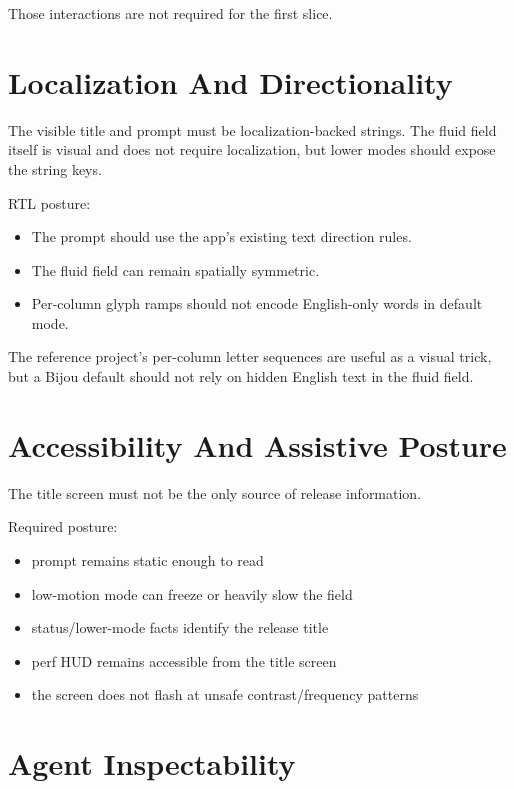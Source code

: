 Those interactions are not required for the first slice.

\section{Localization And Directionality}\label{record-114-localization-and-directionality}

The visible title and prompt must be localization-backed strings. The fluid field itself is visual and does not require localization, but lower modes should expose the string keys.

RTL posture:

\begin{itemize}
\tightlist
\item
  The prompt should use the app's existing text direction rules.
\item
  The fluid field can remain spatially symmetric.
\item
  Per-column glyph ramps should not encode English-only words in default mode.
\end{itemize}

The reference project's per-column letter sequences are useful as a visual trick, but a Bijou default should not rely on hidden English text in the fluid field.

\section{Accessibility And Assistive Posture}\label{record-114-accessibility-and-assistive-posture}

The title screen must not be the only source of release information.

Required posture:

\begin{itemize}
\tightlist
\item
  prompt remains static enough to read
\item
  low-motion mode can freeze or heavily slow the field
\item
  status/lower-mode facts identify the release title
\item
  perf HUD remains accessible from the title screen
\item
  the screen does not flash at unsafe contrast/frequency patterns
\end{itemize}

\section{Agent Inspectability}\label{record-114-agent-inspectability}

